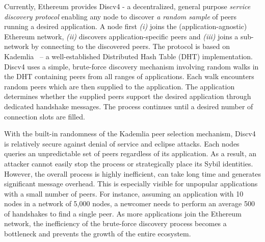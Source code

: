 

 Currently, Ethereum provides Discv4 - a decentralized, general purpose \textit{service discovery protocol} enabling any node to discover \textit{a random sample} of peers running a desired application. A node first \textit{(i)} joins the (application-agnostic) Ethereum network, \textit{(ii)} discovers application-specific peers and \textit{(iii)} joins a sub-network by connecting to the discovered peers. The protocol is based on Kademlia~\cite{maymounkov2002kademlia} – a well-established Distributed Hash Table (DHT) implementation. Discv4 uses a simple, brute-force discovery mechanism involving random walks in the DHT containing peers from all ranges of applications. Each walk encounters random peers which are then supplied to the application. The application determines whether the supplied peers support the desired application through dedicated handshake messages. The process continues until a desired number of connection slots are filled. 

With the built-in randomness of the Kademlia peer selection mechanism, Discv4 is relatively secure against denial of service and eclipse attacks. Each nodes queries an unpredictable set of peers regardless of its application. As a result, an attacker cannot easily stop the process or strategically place its Sybil identities.
However, the overall process is highly inefficient, can take long time and generates significant message overhead. This is especially visible for unpopular applications with a small number of peers.  For instance, assuming an application with 10 nodes in a network of 5,000 nodes, a newcomer needs to perform an average 500 of handshakes to find a single peer. As more applications join the Ethereum network, the inefficiency of the brute-force discovery process becomes a bottleneck and prevents the growth of the entire ecosystem. 

